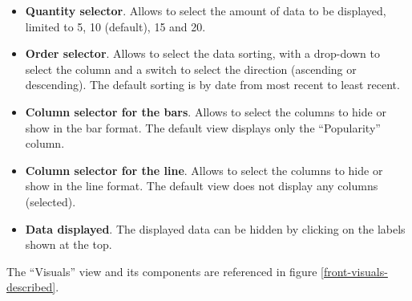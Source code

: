 \begin{itemize}
	 \begin{itemize}
	 	\item \textbf{Quantity selector}. Allows to select the amount of data to be displayed, limited to 5, 10 (default), 15 and 20.
	 	\item \textbf{Order selector}. Allows to select the data sorting, with a drop-down to select the column and a switch to select the direction (ascending or descending). The default sorting is by date from most recent to least recent.
	 	\item \textbf{Column selector for the bars}. Allows to select the columns to hide or show in the bar format. The default view displays only the ``Popularity'' column.
	 	\item \textbf{Column selector for the line}. Allows to select the columns to hide or show in the line format. The default view does not display any columns (selected).
	 	\item \textbf{Data displayed}. The displayed data can be hidden by clicking on the labels shown at the top.
	 \end{itemize}
	 The ``Visuals'' view and its components are referenced in figure \ref{front-visuals-described}.
\end{itemize}



